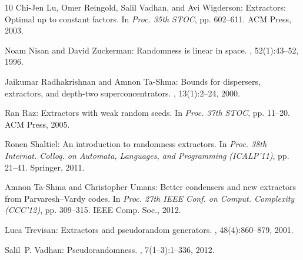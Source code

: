 \begin{thebibliography}{10}
{\sc Chi-Jen Lu, Omer Reingold, Salil Vadhan, and Avi Wigderson}: Extractors:
  Optimal up to constant factors.
\newblock In {\em Proc. 35th STOC}, pp. 602--611. ACM Press, 2003.
\newblock [\epfmtdoi{10.1145/780542.780630}]

{\sc Noam Nisan and David Zuckerman}: Randomness is linear in space.
, 52(1):43--52, 1996.

{\sc Jaikumar Radhakrishnan and Amnon Ta-Shma}: Bounds for dispersers,
  extractors, and depth-two superconcentrators.
, 13(1):2--24, 2000.
\newblock [\epfmtdoi{10.1137/S0895480197329508}]

{\sc Ran Raz}: Extractors with weak random seeds.
\newblock In {\em Proc. 37th STOC}, pp. 11--20. ACM Press, 2005.
\newblock [\epfmtdoi{10.1145/1060590.1060593}]

{\sc Ronen Shaltiel}: An introduction to randomness extractors.
\newblock In {\em Proc. 38th Internat. Colloq. on Automata, Languages, and
  Programming (ICALP'11)}, pp. 21--41. Springer, 2011.
\newblock [\epfmtdoi{10.1007/978-3-642-22012-8\_2}]

{\sc Amnon Ta-Shma and Christopher Umans}: Better condensers and new extractors
  from {P}arvaresh--{V}ardy codes.
\newblock In {\em Proc. 27th IEEE Conf. on Comput. Complexity (CCC'12)}, pp.
  309--315. IEEE Comp. Soc., 2012.

{\sc Luca Trevisan}: Extractors and pseudorandom generators.
, 48(4):860--879, 2001.
\newblock [\epfmtdoi{10.1145/502090.502099}]

{\sc Salil~P. Vadhan}: Pseudorandomness.
, 7(1--3):1--336, 2012.
\newblock [\epfmtdoi{10.1561/0400000010}]

\end{thebibliography}